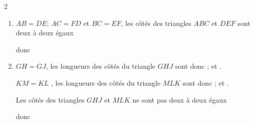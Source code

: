 \begin{corrige}
    \phantom{rrr}    
    \begin{multicols}2
        \begin{enumerate}
            \item $AB=DE$; $AC=FD$ et $BC=EF$, les côtés des triangles $ABC$ et $DEF$ sont deux à deux égaux
            
            donc 
            \item $GH=GJ$, les longueurs des côtés du triangle $GHJ$ sont donc ;  et .
            
            $KM=KL$ , les longueurs des côtés du triangle $MLK$ sont donc ;  et .

            Les côtés des triangles $GHJ$ et $MLK$ ne sont pas deux à deux égaux
            
            donc 
        \end{enumerate}
    \end{multicols}
\end{corrige}

